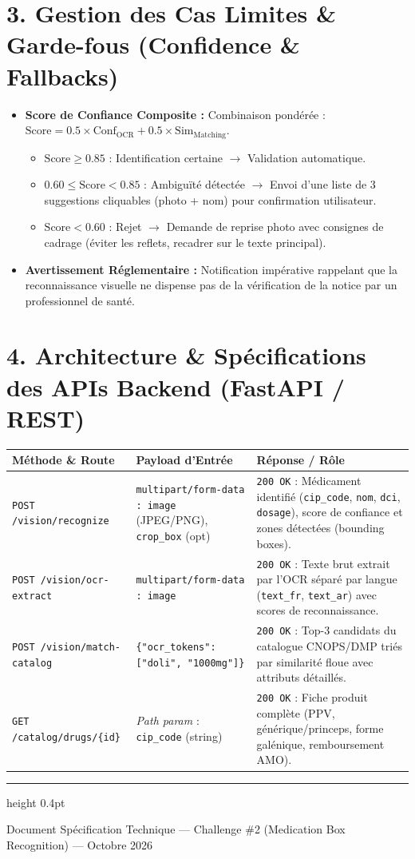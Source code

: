\documentclass[10pt,a4paper]{article}
\begin{document}
\section*{3. Gestion des Cas Limites \& Garde-fous (Confidence \& Fallbacks)}
\begin{itemize}
    \item \textbf{Score de Confiance Composite :} Combinaison pondérée : $\text{Score} = 0.5 \times \text{Conf}_{\text{OCR}} + 0.5 \times \text{Sim}_{\text{Matching}}$.
    \begin{itemize}
        \item $\text{Score} \ge 0.85$ : Identification certaine $\rightarrow$ Validation automatique.
        \item $0.60 \le \text{Score} < 0.85$ : Ambiguïté détectée $\rightarrow$ Envoi d'une liste de 3 suggestions cliquables (photo + nom) pour confirmation utilisateur.
        \item $\text{Score} < 0.60$ : Rejet $\rightarrow$ Demande de reprise photo avec consignes de cadrage (éviter les reflets, recadrer sur le texte principal).
    \end{itemize}
    \item \textbf{Avertissement Réglementaire :} Notification impérative rappelant que la reconnaissance visuelle ne dispense pas de la vérification de la notice par un professionnel de santé.
\end{itemize}

\section*{4. Architecture \& Spécifications des APIs Backend (FastAPI / REST)}
\renewcommand{\arraystretch}{1.25}
\begin{small}
\begin{tabularx}{\textwidth}{@{}l p{4.2cm} X@{}}
\toprule
\textbf{Méthode \& Route} & \textbf{Payload d'Entrée} & \textbf{Réponse / Rôle} \\
\midrule
\texttt{POST /vision/recognize} & \texttt{multipart/form-data : image} (JPEG/PNG), \texttt{crop\_box} (opt) & \texttt{200 OK} : Médicament identifié (\texttt{cip\_code}, \texttt{nom}, \texttt{dci}, \texttt{dosage}), score de confiance et zones détectées (bounding boxes). \\
\texttt{POST /vision/ocr-extract} & \texttt{multipart/form-data : image} & \texttt{200 OK} : Texte brut extrait par l'OCR séparé par langue (\texttt{text\_fr}, \texttt{text\_ar}) avec scores de reconnaissance. \\
\texttt{POST /vision/match-catalog} & \texttt{\{"ocr\_tokens": ["doli", "1000mg"]\}} & \texttt{200 OK} : Top-3 candidats du catalogue CNOPS/DMP triés par similarité floue avec attributs détaillés. \\
\texttt{GET /catalog/drugs/\{id\}} & \textit{Path param} : \texttt{cip\_code} (string) & \texttt{200 OK} : Fiche produit complète (PPV, générique/princeps, forme galénique, remboursement AMO). \\
\bottomrule
\end{tabularx}
\end{small}

\vfill
\hrule height 0.4pt
\vspace{2pt}
\begin{center}
    {\tiny \color{darktext} Document Spécification Technique --- Challenge \#2 (Medication Box Recognition) --- Octobre 2026}
\end{center}
\end{document}
